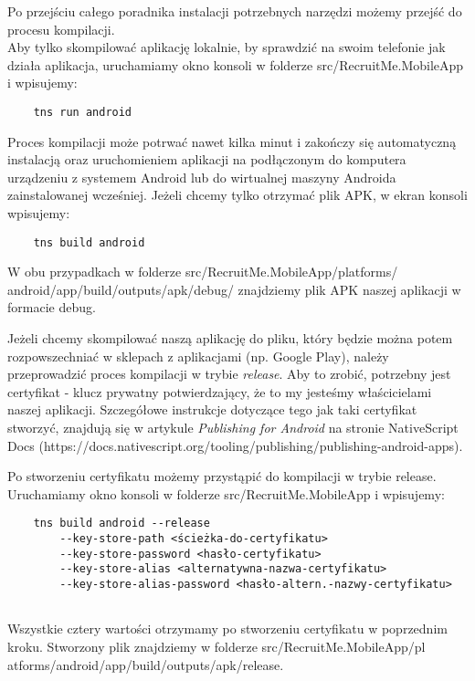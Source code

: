 \documentclass{article}
\begin{document}
Po przejściu całego poradnika instalacji potrzebnych narzędzi możemy przejść do procesu kompilacji.\\Aby tylko skompilować aplikację lokalnie, by sprawdzić na swoim telefonie jak działa aplikacja, uruchamiamy okno konsoli w folderze src/RecruitMe.MobileApp i wpisujemy: 
\begin{verbatim}
    tns run android
\end{verbatim}
Proces kompilacji może potrwać nawet kilka minut i zakończy się automatyczną instalacją oraz uruchomieniem aplikacji na podłączonym do komputera urządzeniu z systemem Android lub do wirtualnej maszyny Androida zainstalowanej wcześniej. Jeżeli chcemy tylko otrzymać plik APK, w ekran konsoli wpisujemy:
\begin{verbatim}
    tns build android
\end{verbatim}
W obu przypadkach w folderze src/RecruitMe.MobileApp/platforms/ \linebreak android/app/build/outputs/apk/debug/ znajdziemy plik APK naszej aplikacji w formacie debug.

Jeżeli chcemy skompilować naszą aplikację do pliku, który będzie można potem rozpowszechniać w sklepach z aplikacjami (np. Google Play), należy przeprowadzić proces kompilacji w trybie \emph{release}. Aby to zrobić, potrzebny jest certyfikat - klucz prywatny potwierdzający, że to my jesteśmy właścicielami naszej aplikacji. Szczegółowe instrukcje dotyczące tego jak taki certyfikat  \linebreak stworzyć, znajdują się w artykule \emph{Publishing for Android} na stronie NativeScript Docs (https://docs.nativescript.org/tooling/publishing/publishing-android-apps).

Po stworzeniu certyfikatu możemy przystąpić do kompilacji w trybie release. Uruchamiamy okno konsoli w folderze src/RecruitMe.MobileApp i wpisujemy: 
\begin{verbatim}
    tns build android --release 
        --key-store-path <ścieżka-do-certyfikatu>
        --key-store-password <hasło-certyfikatu> 
        --key-store-alias <alternatywna-nazwa-certyfikatu> 
        --key-store-alias-password <hasło-altern.-nazwy-certyfikatu>
    
\end{verbatim}
Wszystkie cztery wartości otrzymamy po stworzeniu certyfikatu w poprzednim kroku. Stworzony plik znajdziemy w folderze src/RecruitMe.MobileApp/pl \linebreak atforms/android/app/build/outputs/apk/release. \\
\end{document}
